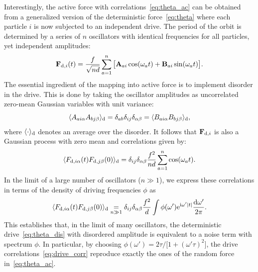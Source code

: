 \documentclass[superscriptaddress, twocolumn, prx, longbibliography, nofootinbib]{revtex4-1}
\newcommand{\dd}{\text{d}}
\newcommand{\ee}{\text{e}}
\newcommand{\ii}{\text{i}}
\begin{document}
Interestingly, the active force with correlations~\eqref{eq:theta_ac} can be obtained from a generalized version of the deterministic force~\eqref{eq:theta} where each particle $i$ is now subjected to an independent drive. The period of the orbit is determined by a series of $n$ oscillators with identical frequencies for all particles, yet independent amplitudes:
\begin{equation}\label{eq:theta_dis}
	{\bf F}_{{\rm d}, i}(t) = \frac{f}{\sqrt{nd}} \sum_{a=1}^n \big[ {\bf A}_{ai} \cos(\omega_a t) + {\bf B}_{ai} \sin(\omega_a t) \big] .
\end{equation}
The essential ingredient of the mapping into active force is to implement disorder in the drive. This is done by taking the oscillator amplitudes as uncorrelated zero-mean Gaussian variables with unit variance:
\begin{equation}
	\langle A_{ai\alpha}A_{bj\beta}\rangle_{\rm d} = \delta_{ab}\delta_{ij}\delta_{\alpha\beta} = \langle B_{ai\alpha}B_{bj\beta}\rangle_{\rm d} ,
\end{equation}
where $\langle\cdot\rangle_{\rm d}$ denotes an average over the disorder. It follows that ${\bf F}_{{\rm d},i}$ is also a Gaussian process with zero mean and correlations given by:
\begin{equation}
	\langle F_{{\rm d},i\alpha} (t) F_{{\rm d},j\beta}(0) \rangle_{\rm d} = \delta_{ij} \delta_{\alpha\beta} \frac{f^2}{nd} \sum_{a=1}^n \cos (\omega_a t). 
\end{equation}
In the limit of a large number of oscillators ($n\gg1$), we express these correlations in terms of the density of driving frequencies $\phi$ as
\begin{equation}\label{eq:drive_corr}
	\langle F_{{\rm d},i\alpha} (t) F_{{\rm d},j\beta}(0) \rangle_\text{d} \underset{n\gg1}{=} \delta_{ij} \delta_{\alpha\beta} \frac{f^2}{d} \int \phi(\omega') \ee^{\ii\omega'|t|} \frac{\dd\omega'}{2\pi} .
\end{equation}
This establishes that, in the limit of many oscillators, the deterministic drive~\eqref{eq:theta_dis} with disordered amplitude is equivalent to a noise term with spectrum $\phi$. In particular, by choosing $\phi(\omega') = 2\tau/ \big[1+(\omega'\tau)^2\big]$, the drive correlations~\eqref{eq:drive_corr} reproduce exactly the ones of the random force in~\eqref{eq:theta_ac}.
\end{document}
